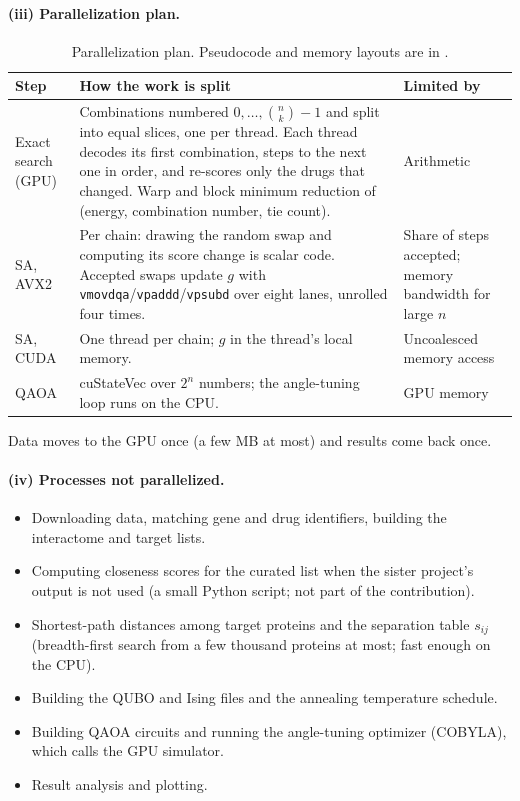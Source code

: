 \paragraph{(iii) Parallelization plan.}

\begin{table}[ht]
\centering
\small
\begin{tabularx}{\linewidth}{>{\raggedright\arraybackslash}p{2.9cm}X>{\raggedright\arraybackslash}p{2.3cm}}
\toprule
Step & How the work is split & Limited by \\
\midrule
Exact search (GPU) & Combinations numbered $0,\dots,\binom{n}{k}-1$ and split into equal slices, one per thread. Each thread decodes its first combination, steps to the next one in order, and re-scores only the drugs that changed. Warp and block minimum reduction of (energy, combination number, tie count). & Arithmetic \\
SA, AVX2 & Per chain: drawing the random swap and computing its score change is scalar code. Accepted swaps update $g$ with \texttt{vmovdqa}/\texttt{vpaddd}/\texttt{vpsubd} over eight lanes, unrolled four times. & Share of steps accepted; memory bandwidth for large $n$ \\
SA, CUDA & One thread per chain; $g$ in the thread's local memory. & Uncoalesced memory access \\
QAOA & cuStateVec over $2^n$ numbers; the angle-tuning loop runs on the CPU. & GPU memory \\
\bottomrule
\end{tabularx}
\caption{Parallelization plan. Pseudocode and memory layouts are in .}
\label{tab:parplan}
\end{table}

Data moves to the GPU once (a few MB at most) and results come back once.

\paragraph{(iv) Processes not parallelized.}
\begin{itemize}
\item Downloading data, matching gene and drug identifiers, building the interactome and target lists.
\item Computing closeness scores for the curated list when the sister project's output is not used (a small Python script; not part of the contribution).
\item Shortest-path distances among target proteins and the separation table $s_{ij}$ (breadth-first search from a few thousand proteins at most; fast enough on the CPU).
\item Building the QUBO and Ising files and the annealing temperature schedule.
\item Building QAOA circuits and running the angle-tuning optimizer (COBYLA), which calls the GPU simulator.
\item Result analysis and plotting.
\end{itemize}


